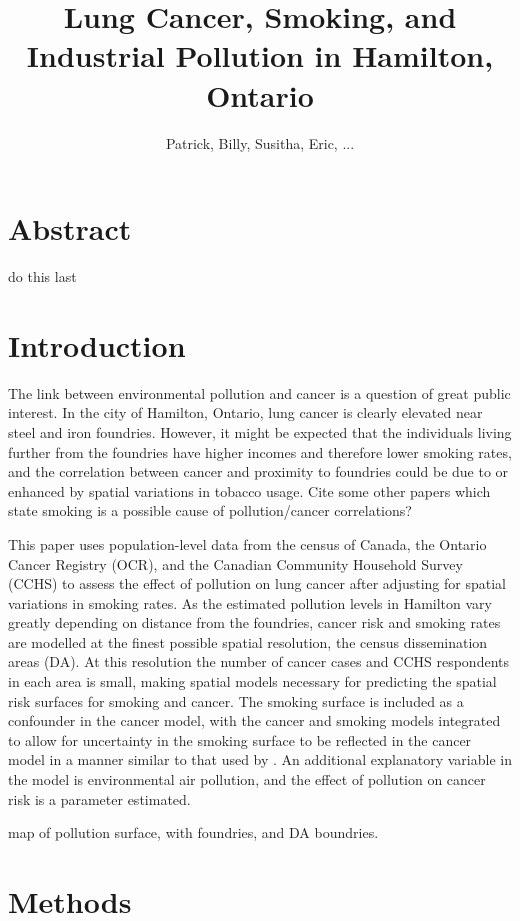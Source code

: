 \documentclass[12pt]{article}
\title{Lung Cancer, Smoking, and Industrial Pollution in Hamilton, Ontario}
\author{Patrick, Billy,  Susitha, Eric, ...}
\begin{document}
\maketitle

\section*{Abstract}

do this last


\section{Introduction}

The link between environmental  pollution and cancer is a question of great public interest.   In the city of Hamilton, Ontario, lung cancer is clearly elevated near steel and iron foundries.  However, it might be expected that the individuals living further from the foundries have higher incomes and therefore lower smoking rates, and the correlation between cancer and proximity to foundries could be due to or enhanced by spatial variations in tobacco usage.  Cite some other papers which state smoking is a possible cause of pollution/cancer correlations?

This paper uses population-level data from the census  of Canada, the Ontario Cancer Registry (OCR), and the Canadian
Community Household Survey (CCHS) to assess the effect of pollution on lung cancer after adjusting for spatial variations in smoking rates.  As the estimated pollution levels in Hamilton vary greatly depending on distance from the foundries, cancer risk and smoking rates are modelled at the finest possible spatial resolution, the census dissemination areas (DA).  At this resolution the number of cancer cases and CCHS respondents in each area is small, making spatial models necessary for predicting the spatial risk surfaces for smoking and cancer.  The smoking surface is included as a confounder in the cancer model, with the cancer and smoking models integrated to allow for uncertainty in the smoking surface to be reflected in the cancer model in a manner similar to that used by \cite{BILY ADD REFERENCE}.  An additional explanatory variable in the model is environmental air pollution, and the effect of pollution on cancer risk is a parameter estimated.  


map of pollution surface, with foundries, and DA boundries. 


\section{Methods}
\end{document}
